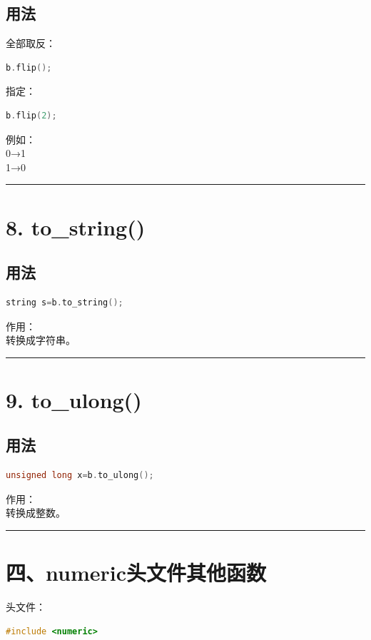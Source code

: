 \documentclass[10pt,twocolumn]{extarticle}
\begin{document}
\subsection{用法}
全部取反：
\begin{lstlisting}[language=C++]
b.flip();
\end{lstlisting}
指定：
\begin{lstlisting}[language=C++]
b.flip(2);
\end{lstlisting}
例如：\\
0→1\\
1→0

\noindent\rule{\linewidth}{0.4pt}

\section{8. to\_string()}

\subsection{用法}
\begin{lstlisting}[language=C++]
string s=b.to_string();
\end{lstlisting}
作用：\\
转换成字符串。

\noindent\rule{\linewidth}{0.4pt}

\section{9. to\_ulong()}

\subsection{用法}
\begin{lstlisting}[language=C++]
unsigned long x=b.to_ulong();
\end{lstlisting}
作用：\\
转换成整数。

\noindent\rule{\linewidth}{0.4pt}

\section{四、numeric头文件其他函数}

头文件：
\begin{lstlisting}[language=C++]
#include <numeric>
\end{lstlisting}
\end{document}
